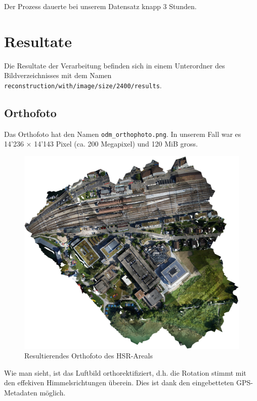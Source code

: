 \noindent Der Prozess dauerte bei unserem Datensatz knapp 3 Stunden.


\section{Resultate}

Die Resultate der Verarbeitung befinden sich in einem Unterordner des
Bildverzeichnisses mit dem Namen
\texttt{reconstruction\-/with\-/image\-/size\-/2400\-/results}.

\subsection{Orthofoto}

Das Orthofoto hat den Namen \texttt{odm\_orthophoto.png}. In unserem Fall war es
14'236 $\times$ 14'143 Pixel (ca. 200 Megapixel) und 120 MiB gross.

\begin{figure}[H]
	\centering
	\includegraphics[width=\textwidth]{images/odm_orthophoto}
	\caption{Resultierendes Orthofoto des HSR-Areals}
	\label{img:odm_orthophoto}
\end{figure}

\noindent Wie man sieht, ist das Luftbild orthorektifiziert, d.h. die Rotation
stimmt mit den effekiven Himmelsrichtungen überein. Dies ist dank den
eingebetteten GPS-Metadaten möglich.

